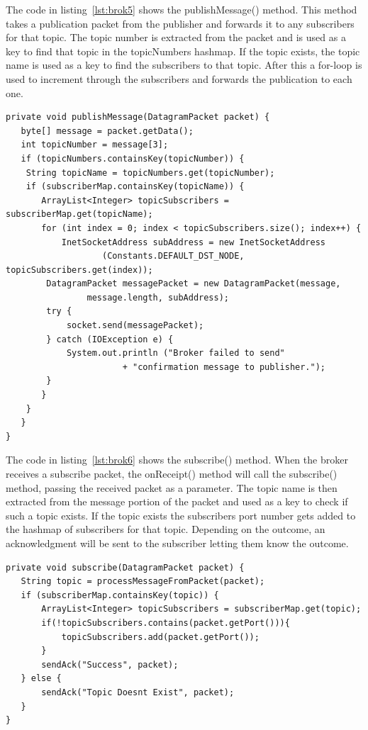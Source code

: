 \documentclass{article}
\begin{document}
The code in listing~\ref{lst:brok5} shows the publishMessage() method. This method takes a publication packet from the publisher and forwards it to any subscribers for that topic. The topic number is extracted from the packet and is used as a key to find that topic in the topicNumbers hashmap. If the topic exists, the topic name is used as a key to find the subscribers to that topic. After this a for-loop is used to increment through the subscribers and forwards the publication to each one.

\begin{lstlisting}[caption={[Sample Code 2]onReceipt() method, handles packets received on the publishers port}, label={lst:brok5}]
private void publishMessage(DatagramPacket packet) {
   byte[] message = packet.getData();
   int topicNumber = message[3];
   if (topicNumbers.containsKey(topicNumber)) {
	String topicName = topicNumbers.get(topicNumber);
	if (subscriberMap.containsKey(topicName)) {
	   ArrayList<Integer> topicSubscribers = subscriberMap.get(topicName);
	   for (int index = 0; index < topicSubscribers.size(); index++) {
		   InetSocketAddress subAddress = new InetSocketAddress
                   (Constants.DEFAULT_DST_NODE, topicSubscribers.get(index));
		DatagramPacket messagePacket = new DatagramPacket(message,
                message.length, subAddress);
		try {
			socket.send(messagePacket);
		} catch (IOException e) {
			System.out.println ("Broker failed to send" 
                       + "confirmation message to publisher.");
		}
	   }
	}
   }
}
\end{lstlisting}

The code in listing~\ref{lst:brok6} shows the subscribe() method. When the broker receives a subscribe packet, the onReceipt() method will call the subscribe() method, passing the received packet as a parameter. The topic name is then extracted from the message portion of the packet and used as a key to check if such a topic exists. If the topic exists the subscribers port number gets added to the hashmap of subscribers for that topic. Depending on the outcome, an acknowledgment will be sent to the subscriber letting them know the outcome.

\begin{lstlisting}[caption={[Sample Code 2]onReceipt() method, handles packets received on the publishers port}, label={lst:brok6}]
private void subscribe(DatagramPacket packet) {
   String topic = processMessageFromPacket(packet);
   if (subscriberMap.containsKey(topic)) {
	   ArrayList<Integer> topicSubscribers = subscriberMap.get(topic);
	   if(!topicSubscribers.contains(packet.getPort())){
		   topicSubscribers.add(packet.getPort());
	   }
	   sendAck("Success", packet);
   } else {
	   sendAck("Topic Doesnt Exist", packet);
   }
}
\end{lstlisting}
\end{document}
